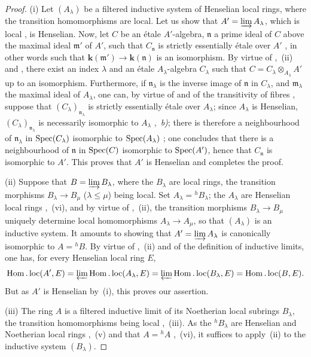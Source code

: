 \begin{proof}
(i) Let $(A_\lambda)$ be a filtered inductive system of Henselian local rings, where the transition homomorphisms are local.
Let us show that $A'=\varinjlim A_\lambda$, which is local , is Henselian.
Now, let $C$ be an \'{e}tale $A'$-algebra, $\mathfrak{n}$ a prime ideal
of $C$ above the maximal ideal $\mathfrak{m}'$ of $A'$, such that $C_{\mathfrak{n}}$ is strictly essentially \'{e}tale over $A'$ , in other words such that $\boldsymbol{k}(\mathfrak{m}')\to\boldsymbol{k}(\mathfrak{n})$ is an isomorphism. By virtue of ,~(ii) and , there exist an index $\lambda$ and an \'{e}tale $A_\lambda$-algebra $C_\lambda$ such that $C=C_\lambda\otimes_{A_\lambda}A'$ up to an isomorphism.
Furthermore, if $\mathfrak{n}_\lambda$ is the inverse image of $\mathfrak{n}$ in $C_\lambda$, and $\mathfrak{m}_\lambda$ the maximal ideal of $A_\lambda$, one can, by virtue of  and of the transitivity of fibres , suppose that $(C_\lambda)_{\mathfrak{n}_\lambda}$ is strictly essentially \'{e}tale over $A_\lambda$;
since $A_\lambda$ is Henselian, $(C_\lambda)_{\mathfrak{n}_\lambda}$ is necessarily isomorphic to $A_\lambda$ ,~\emph{b)};
there is therefore a neighbourhood of $\mathfrak{n}_\lambda$ in $\operatorname{Spec}(C_\lambda)$ isomorphic to $\operatorname{Spec}(A_\lambda)$ ;
one concludes that there is a neighbourhood of $\mathfrak{n}$ in $\operatorname{Spec}(C)$ isomorphic to $\operatorname{Spec}(A')$, hence that $C_\mathfrak{n}$ is isomorphic to $A'$.  This proves that $A'$ is Henselian  and completes the proof.

(ii) Suppose that $B=\varinjlim B_\lambda$, where the $B_\lambda$ are local rings, the transition morphisms $B_\lambda\to B_\mu$ ($\lambda\leq\mu$) being local.
Set $A_\lambda={}^h\!B_\lambda$;
the $A_\lambda$ are Henselian local rings ,~(vi), and by virtue of ,~(ii), the transition morphisms $B_\lambda\to B_\mu$ uniquely determine local homomorphisms $A_\lambda\to A_\mu$, so that $(A_\lambda)$ is an inductive system.
It amounts to showing that $A'=\varinjlim A_\lambda$ is canonically isomorphic to $A={}^h\!B$.
By virtue of ,~(ii) and of the definition of inductive limits, one has, for every Henselian local ring $E$,
\[
  \operatorname{Hom}.\operatorname{loc}(A',E)=\varprojlim\operatorname{Hom}.\operatorname{loc}(A_\lambda,E)=\varprojlim\operatorname{Hom}.\operatorname{loc}(B_\lambda,E)=\operatorname{Hom}.\operatorname{loc}(B,E).
\]
But as $A'$ is Henselian by~(i), this proves our assertion.

(iii) The ring $A$ is a filtered inductive limit of its Noetherian local subrings $B_\lambda$, the transition homomorphisms being local ,~(iii).
As the ${}^h\!B_\lambda$ are Henselian and Noetherian local rings ,~(v) and that $A={}^h\!A$ ,~(vi), it suffices to apply~(ii) to the inductive system $(B_\lambda)$.
\end{proof}

